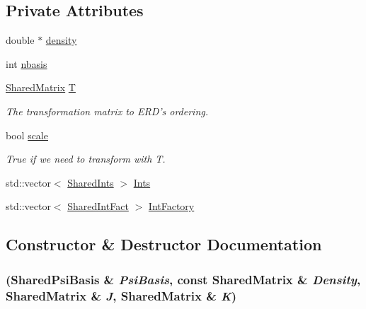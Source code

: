 \subsection*{Private Attributes}
\begin{DoxyCompactItemize}
\item 
double $\ast$ \hyperlink{classpsi_1_1scf_1_1Psi4JK_a92cb38c784d8c2e0b1c80d40e5a2fe64}{density}
\item 
int \hyperlink{classpsi_1_1scf_1_1Psi4JK_a58cb6ef9f81c24f9444912b29a402a7a}{nbasis}
\item 
\hyperlink{namespacepsi_a672173d36fd5e5d06c17ff19c3bacb9d}{SharedMatrix} \hyperlink{classpsi_1_1scf_1_1Psi4JK_af705cc477a1c67061c47a2e881c15422}{T}
\begin{DoxyCompactList}\small\item\em The transformation matrix to ERD's ordering. \item\end{DoxyCompactList}\item 
bool \hyperlink{classpsi_1_1scf_1_1Psi4JK_aff7a60d3f21b50f4ad18e40d99d33a61}{scale}
\begin{DoxyCompactList}\small\item\em True if we need to transform with T. \item\end{DoxyCompactList}\item 
std::vector$<$ \hyperlink{namespacepsi_a7b2115040860b8011075023be6fbeb9a}{SharedInts} $>$ \hyperlink{classpsi_1_1scf_1_1Psi4JK_abf9e78c6ffafd24366286f9dbf937e14}{Ints}
\item 
std::vector$<$ \hyperlink{namespacepsi_a3b03bcb6d101bc7caa7ea1a26b9e1f50}{SharedIntFact} $>$ \hyperlink{classpsi_1_1scf_1_1Psi4JK_a63f6583dc209a73acfa1cb9c7cfc3553}{IntFactory}
\end{DoxyCompactItemize}


\subsection{Constructor \& Destructor Documentation}
\hypertarget{classpsi_1_1scf_1_1Psi4JK_ad4c73ca14721107f570bbf67a1ce18bb}{
\subsubsection[{Psi4JK}]{ ({\bf SharedPsiBasis} \& {\em PsiBasis}, \/  const {\bf SharedMatrix} \& {\em Density}, \/  {\bf SharedMatrix} \& {\em J}, \/  {\bf SharedMatrix} \& {\em K})}}
\label{classpsi_1_1scf_1_1Psi4JK_ad4c73ca14721107f570bbf67a1ce18bb}


